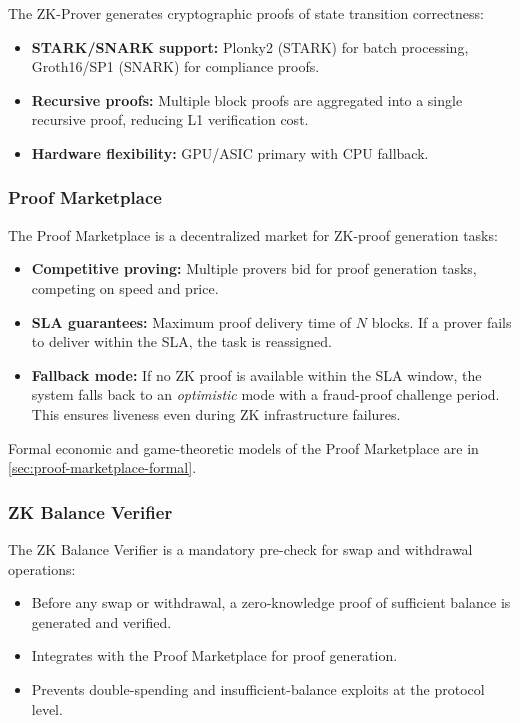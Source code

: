 \documentclass[12pt,a4paper]{article}
\theoremstyle{definition}
\theoremstyle{remark}
\begin{document}
The ZK-Prover generates cryptographic proofs of state transition correctness:
\begin{itemize}[nosep]
    \item \textbf{STARK/SNARK support:} Plonky2 (STARK) for batch processing, Groth16/SP1 (SNARK) for compliance proofs.
    \item \textbf{Recursive proofs:} Multiple block proofs are aggregated into a single recursive proof, reducing L1 verification cost.
    \item \textbf{Hardware flexibility:} GPU/ASIC primary with CPU fallback.
\end{itemize}

\subsubsection{Proof Marketplace}
\label{sec:proof-marketplace-arch}

The Proof Marketplace is a decentralized market for ZK-proof generation tasks:
\begin{itemize}[nosep]
    \item \textbf{Competitive proving:} Multiple provers bid for proof generation tasks, competing on speed and price.
    \item \textbf{SLA guarantees:} Maximum proof delivery time of $N$ blocks. If a prover fails to deliver within the SLA, the task is reassigned.
    \item \textbf{Fallback mode:} If no ZK proof is available within the SLA window, the system falls back to an \emph{optimistic} mode with a fraud-proof challenge period. This ensures liveness even during ZK infrastructure failures.
\end{itemize}

Formal economic and game-theoretic models of the Proof Marketplace are in \cref{sec:proof-marketplace-formal}.

\subsubsection{ZK Balance Verifier}
\label{sec:zk-balance-verifier}

The ZK Balance Verifier is a mandatory pre-check for swap and withdrawal operations:
\begin{itemize}[nosep]
    \item Before any swap or withdrawal, a zero-knowledge proof of sufficient balance is generated and verified.
    \item Integrates with the Proof Marketplace for proof generation.
    \item Prevents double-spending and insufficient-balance exploits at the protocol level.
\end{itemize}
\end{document}
